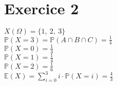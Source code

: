 \documentclass[td3.tex]{subfiles}
\begin{document}
\section{Exercice 2}
$X(\Omega) = \{ 1,~2,~3 \}$ \\
$\mathbb{P}(X = 3) = \mathbb{P}(A \cap B \cap C) = \frac{1}{4}$ \\
$\mathbb{P}(X = 0) = \frac{1}{3}$ \\
$\mathbb{P}(X = 1) = \frac{1}{4}$ \\
$\mathbb{P}(X = 2) = \frac{1}{6}$ \\
$\mathbb{E}(X) = \sum_{i=0}^{3} i\cdot \mathbb{P}(X=i) = \frac{4}{3}$
\end{document}
